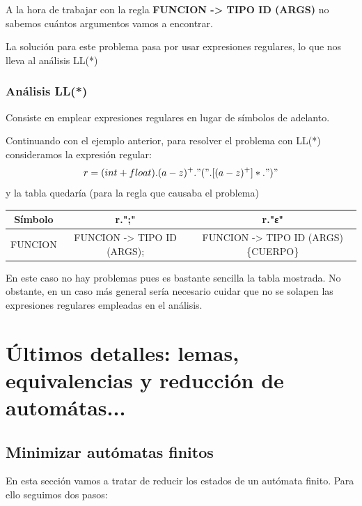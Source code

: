 \documentclass{apuntes}
\begin{document}
A la hora de trabajar con la regla \textbf{FUNCION -> TIPO ID (ARGS)} no sabemos cuántos argumentos vamos a encontrar.

La solución para este problema pasa por usar expresiones regulares, lo que nos lleva al análisis LL(*)

\subsection{Análisis LL(*)}
Consiste en emplear expresiones regulares en lugar de símbolos de adelanto.

Continuando con el ejemplo anterior, para resolver el problema con LL(*) consideramos la expresión regular:
\[r=(int+float).(a-z)^+."(".[(a-z)^+]*.")"\]
y la tabla quedaría (para la regla que causaba el problema)
\begin{center}
\begin{tabular}{| c | c | c |}
\hline
Símbolo & r.";" & r."ε" \\
\hline
FUNCION & FUNCION -> TIPO ID (ARGS); &  FUNCION -> TIPO ID (ARGS) \{CUERPO\} \\
\hline
\end{tabular}
\end{center}
En este caso no hay problemas pues es bastante sencilla la tabla mostrada. No obstante, en un caso más general sería necesario cuidar que no se solapen las expresiones regulares empleadas en el análisis.

\newpage
\chapter{Últimos detalles: lemas, equivalencias y reducción de automátas...}

\section{Minimizar autómatas finitos}
En esta sección vamos a tratar de reducir los estados de un autómata finito. Para ello seguimos dos pasos:
\end{document}
